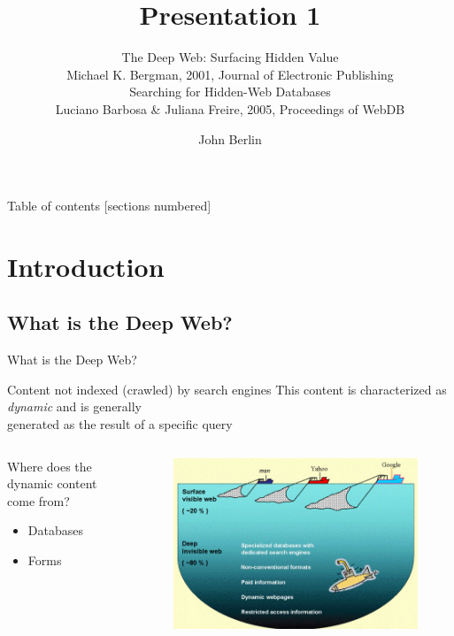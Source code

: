 \documentclass{beamer}
\author{John Berlin}
\subtitle{
\normalsize{The Deep Web: Surfacing Hidden Value} \\  \footnotesize{Michael K. Bergman},  2001, Journal of Electronic Publishing\\ 
\normalsize{Searching for Hidden-Web Databases} \\ \footnotesize{Luciano Barbosa \& Juliana Freire}, 2005, Proceedings of WebDB
}
\title{Presentation 1}
\institute{Old Dominion University \\ Introduction to Information Retrieval \\ CS734/834   }
\begin{document}
\maketitle

\begin{frame}{Table of contents}
  [sections numbered]
  \tableofcontents[hideallsubsections]
\end{frame}



\section{Introduction}
\subsection{What is the Deep Web?}

\begin{frame}[fragile]{What is the Deep Web?}
	\begin{block}{Content not indexed (\alert{crawled}) by search engines}
	This content is characterized as \emph{dynamic} and is generally \\
	generated as the result of a specific query
  \end{block}
   \begin{columns}[T,onlytextwidth]
		\begin{block}{Where does the dynamic content come from?}
			\begin{itemize}
     			  \item Databases
   				 \item Forms
  			\end{itemize}
  		\end{block}
  		\begin{figure}
			\includegraphics[scale=0.3]{invisible-web.gif}
		\end{figure}
  \end{columns}
\end{frame}
\end{document}
